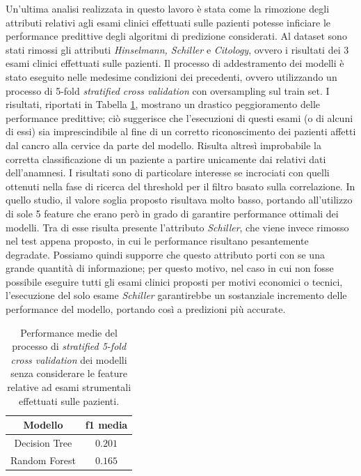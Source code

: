 Un'ultima analisi realizzata in questo lavoro è stata come la rimozione degli attributi relativi agli esami clinici effettuati sulle pazienti potesse inficiare le performance predittive degli algoritmi di predizione considerati. Al dataset sono stati rimossi gli attributi \textit{Hinselmann, Schiller} e \textit{Citology}, ovvero i risultati dei 3 esami clinici effettuati sulle pazienti. Il processo di addestramento dei modelli è stato eseguito nelle medesime condizioni dei precedenti, ovvero utilizzando un processo di 5-fold \textit{stratified cross validation} con oversampling sul train set. I risultati, riportati in Tabella \ref{tab:noexamsscore}, mostrano un drastico peggioramento delle performance predittive; ciò suggerisce che l'esecuzioni di questi esami (o di alcuni di essi) sia imprescindibile al fine di un corretto riconoscimento dei pazienti affetti dal cancro alla cervice da parte del modello. Risulta altresì improbabile la corretta classificazione di un paziente a partire unicamente dai relativi dati dell'anamnesi.
I risultati sono di particolare interesse se incrociati con quelli ottenuti nella fase di ricerca del threshold per il filtro basato sulla correlazione. In quello studio, il valore soglia proposto risultava molto basso, portando all'utilizzo di sole 5 feature che erano però in grado di garantire performance ottimali dei modelli. Tra di esse risulta presente l'attributo \textit{Schiller}, che viene invece rimosso nel test appena proposto, in cui le performance risultano pesantemente degradate. Possiamo quindi supporre che questo attributo porti con se una grande quantità di informazione; per questo motivo, nel caso in cui non fosse possibile eseguire tutti gli esami clinici proposti per motivi economici o tecnici, l'esecuzione del solo esame \textit{Schiller} garantirebbe un sostanziale incremento delle performance del modello, portando così a predizioni più accurate.
\begin{table}
	\centering
	\caption{Performance medie del processo di \textit{stratified 5-fold cross validation} dei modelli senza considerare le feature relative ad esami strumentali effettuati sulle pazienti.}
	\label{tab:noexamsscore}
	\begin{tabular}{|c|c|}
		\toprule
		Modello & f1 media \\ 
		\midrule 
		Decision Tree & $0.201$ \\
		Random Forest & $0.165$ \\ 
		\bottomrule
	\end{tabular}
\end{table}